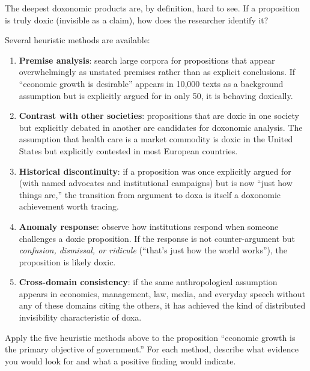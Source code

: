The deepest doxonomic products are, by definition, hard to see.
If a proposition is truly doxic (invisible as a claim), how does the researcher identify it?

Several heuristic methods are available:

\begin{enumerate}[nosep]
  \item \textbf{Premise analysis}: search large corpora for propositions that appear overwhelmingly as unstated premises rather than as explicit conclusions.
  If ``economic growth is desirable'' appears in 10,000 texts as a background assumption but is explicitly argued for in only 50, it is behaving doxically.

  \item \textbf{Contrast with other societies}: propositions that are doxic in one society but explicitly debated in another are candidates for doxonomic analysis.
  The assumption that health care is a market commodity is doxic in the United States but explicitly contested in most European countries.

  \item \textbf{Historical discontinuity}: if a proposition was once explicitly argued for (with named advocates and institutional campaigns) but is now ``just how things are,'' the transition from argument to doxa is itself a doxonomic achievement worth tracing.

  \item \textbf{Anomaly response}: observe how institutions respond when someone challenges a doxic proposition.
  If the response is not counter-argument but \emph{confusion, dismissal, or ridicule} (``that's just how the world works''), the proposition is likely doxic.

  \item \textbf{Cross-domain consistency}: if the same anthropological assumption appears in economics, management, law, media, and everyday speech without any of these domains citing the others, it has achieved the kind of distributed invisibility characteristic of doxa.
\end{enumerate}

\begin{exercise}
\label{ex:ch2-detect-doxa}
Apply the five heuristic methods above to the proposition ``economic growth is the primary objective of government.''
For each method, describe what evidence you would look for and what a positive finding would indicate.
\end{exercise}


